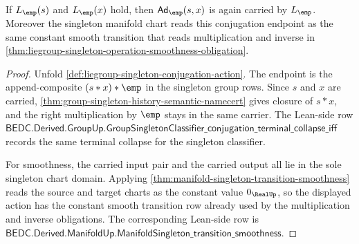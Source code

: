 \begin{theorem}
\label{thm:liegroup-singleton-conjugation-carrier-and-smoothness}
If $L_{\emp}(s)$ and $L_{\emp}(x)$ hold, then
$\mathsf{Ad}_{\emp}(s,x)$ is again carried by $L_{\emp}$. Moreover the singleton
manifold chart reads this conjugation endpoint as the same constant smooth
transition that reads multiplication and inverse in
\autoref{thm:liegroup-singleton-operation-smoothness-obligation}.
\end{theorem}
\begin{proof}
Unfold \autoref{def:liegroup-singleton-conjugation-action}. The endpoint is the
append-composite $(s*x)*\emp$ in the singleton group rows. Since $s$ and $x$ are
carried, \autoref{thm:group-singleton-history-semantic-namecert} gives closure
of $s*x$, and the right multiplication by $\emp$ stays in the same carrier. The
Lean-side row
$\mathsf{BEDC.Derived.GroupUp.GroupSingletonClassifier\_conjugation\_terminal\_collapse\_iff}$
records the same terminal collapse for the singleton classifier.

For smoothness, the carried input pair and the carried output all lie in the
sole singleton chart domain. Applying
\autoref{thm:manifold-singleton-transition-smoothness} reads the source and
target charts as the constant value $0_{\RealUp}$, so the displayed action has
the constant smooth transition row already used by the multiplication and
inverse obligations. The corresponding Lean-side row is
$\mathsf{BEDC.Derived.ManifoldUp.ManifoldSingleton\_transition\_smoothness}$.
\end{proof}

